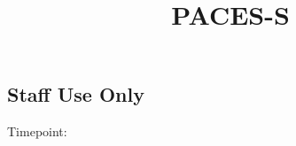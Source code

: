 \documentclass[
  14pt,
  english,
  a4paper,
  sdaps_style=qr,
  checkmode=check
]{sdapsclassic}
\title{PACES-S}
\author{}
\date{}
\begin{document}
\begin{questionnaire}[noinfo]


\section{Staff Use Only}

    \noindent
    \begin{minipage}[t]{0.48\linewidth}
    \end{minipage}\hfill
    \begin{minipage}[t]{0.48\linewidth}
    \end{minipage}

    \noindent
    \begin{minipage}[c]{3cm}
        Timepoint:
    \end{minipage}%
    \begin{minipage}[c]{\dimexpr\linewidth-3cm\relax}
        \begin{optionquestion}[cols=3, var=timepoint]{}
        \end{optionquestion}
    \end{minipage}


\end{questionnaire}
\end{document}
